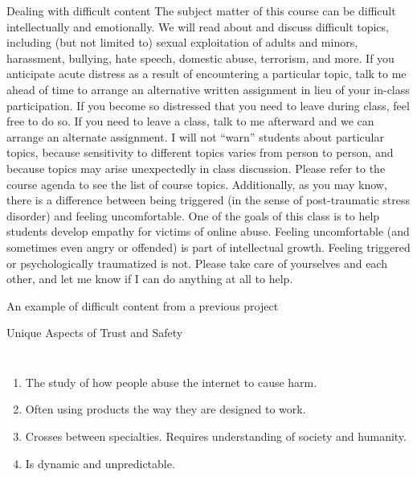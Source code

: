 \documentclass[nobackground,dvipsnames,table]{beamer}
\begin{document}
\begin{frame}{Dealing with difficult content}
    \footnotesize
    The subject matter of this course can be difficult intellectually and emotionally.  We will read about and discuss difficult topics, including (but not limited to) sexual exploitation of adults and minors, harassment, bullying, hate speech, domestic abuse, terrorism, and more. \newline 
    If you anticipate acute distress as a result of encountering a particular topic, talk to me ahead of time to arrange an alternative written assignment in lieu of your in-class participation. If you become so distressed that you need to leave during class, feel free to do so. If you need to leave a class, talk to me afterward and we can arrange an alternate assignment.  I will not “warn” students about particular topics, because sensitivity to different topics varies from person to person, and because topics may arise unexpectedly in class discussion. Please refer to the course agenda to see the list of course topics. \newline
    Additionally, as you may know, there is a difference between being triggered (in the sense of post-traumatic stress disorder) and feeling uncomfortable. One of the goals of this class is to help students develop empathy for victims of online abuse. Feeling uncomfortable (and sometimes even angry or offended) is part of intellectual growth. Feeling triggered or psychologically traumatized is not. Please take care of yourselves and each other, and let me know if I can do anything at all to help.
\end{frame}

\begin{frame}{An example of difficult content from a previous project}
\end{frame}


\begin{frame}{Unique Aspects of Trust and Safety}
    \begin{columns}
            \begin{enumerate}
                \item The study of how people abuse the internet to cause harm.
                \item Often using products the way they are designed to work.
                \item Crosses between specialties. Requires understanding of society and humanity.
                \item Is dynamic and unpredictable. 
            \end{enumerate}
    \end{columns}
\end{frame}
\end{document}
